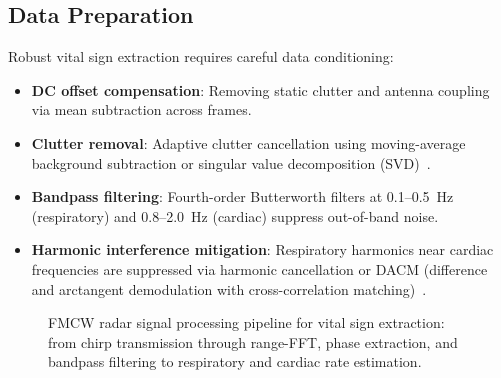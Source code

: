 \documentclass[journal,twoside]{IEEEtran}
\begin{document}
\subsection{Data Preparation}
Robust vital sign extraction requires careful data conditioning:
\begin{itemize}
\item \textbf{DC offset compensation}: Removing static clutter and antenna coupling via mean subtraction across frames.
\item \textbf{Clutter removal}: Adaptive clutter cancellation using moving-average background subtraction or singular value decomposition (SVD)~\cite{ref_svd_clutter2024}.
\item \textbf{Bandpass filtering}: Fourth-order Butterworth filters at 0.1--0.5~Hz (respiratory) and 0.8--2.0~Hz (cardiac) suppress out-of-band noise.
\item \textbf{Harmonic interference mitigation}: Respiratory harmonics near cardiac frequencies are suppressed via harmonic cancellation or DACM (difference and arctangent demodulation with cross-correlation matching)~\cite{ref_dacm2023}.
\end{itemize}

\begin{figure}[!t]
\centering
{}
\caption{FMCW radar signal processing pipeline for vital sign extraction: from chirp transmission through range-FFT, phase extraction, and bandpass filtering to respiratory and cardiac rate estimation.}
\label{fig:fmcw_pipeline}
\end{figure}
\end{document}
